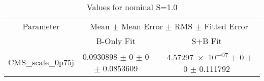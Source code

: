 \begin{table}
\centering
\caption{Values for nominal S=1.0}
\begin{tabular}{ccc}
\toprule
Parameter 	& \multicolumn{2}{c}{Mean $\pm$ Mean Error $\pm$ RMS $\pm$ Fitted Error}\\
 	& B-Only Fit & S+B Fit\\
\midrule
CMS\_scale\_0p75j 	& \num{0.0930898} $\pm$ \num{0} $\pm$ \num{0} $\pm$ \num{0.0853609} 	& \num{-4.57297e-07} $\pm$ \num{0} $\pm$ \num{0} $\pm$ \num{0.111792}\\
\bottomrule
\end{tabular}
\end{table}